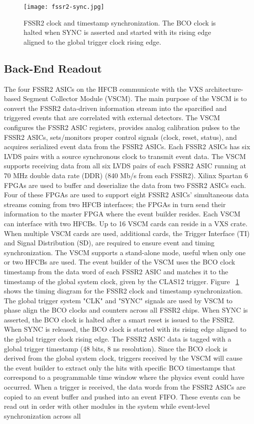\begin{figure}[hbt] 
\centering 
\texttt{[image: fssr2-sync.jpg]}
\caption{FSSR2 clock and timestamp synchronization. The BCO clock is halted when SYNC is asserted and started with its rising edge aligned to the global trigger clock rising edge. }
\label{fig:fssr2-sync}
\end{figure}

\subsection{Back-End Readout}

The four FSSR2 ASICs on the HFCB communicate with the VXS architecture-based Segment Collector Module (VSCM). The main purpose of the VSCM is to convert the FSSR2 data-driven information stream into the sparcified and triggered events that are correlated with external detectors. The VSCM configures the FSSR2 ASIC registers, provides analog calibration pulses to the FSSR2 ASICs, sets/monitors proper control signals (clock, reset, status), and acquires serialized event data from the FSSR2 ASICs. Each FSSR2 ASICs has six LVDS pairs with a source synchronous clock to transmit event data. The VSCM supports receiving data from all six LVDS pairs of each FSSR2 ASIC running at 70 MHz double data rate (DDR) (840 Mb/s from each FSSR2). Xilinx Spartan 6 FPGAs are used to buffer and deserialize the data from two FSSR2 ASICs each. Four of these FPGAs are used to support eight FSSR2 ASICs' simultaneous data streams coming from two HFCB interfaces; the FPGAs in turn send their information to the master FPGA where the event builder resides. Each VSCM can interface with two HFCBs. Up to 16 VSCM cards can reside in a VXS crate. When multiple VSCM cards are used, additional cards, the Trigger Interface (TI) and Signal Distribution (SD), are required to ensure event and timing synchronization. The VSCM supports a stand-alone mode, useful when only one or two HFCBs are used. The event builder of the VSCM uses the BCO clock timestamp from the data word of each FSSR2 ASIC and matches it to the timestamp of the global system clock, given by the CLAS12 trigger. Figure ~\ref{fig:fssr2-sync} shows the timing diagram for the FSSR2 clock and timestamp synchronization. The global trigger system "CLK" and "SYNC" signals are used by VSCM to phase align the BCO clocks  and counters across all FSSR2 chips. When SYNC is asserted, the BCO clock is halted after a smart reset is issued to the FSSR2. When SYNC is released, the BCO clock is started with its rising edge aligned to the global trigger clock rising edge. The FSSR2 ASIC data is tagged with a global trigger timestamp (48 bits, 8 ns resolution). Since the BCO clock is derived from the global system clock, triggers received by the VSCM will cause the event builder to extract only the hits with specific BCO timestamps that correspond to a programmable time window where the physics event could have occurred. When a trigger is received, the data words from the FSSR2 ASICs are copied to an event buffer and pushed into an event FIFO. These events can be read out in order with other modules in the system while event-level synchronization across all 